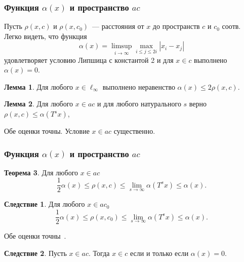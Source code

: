 \documentclass[10pt,pdf,hyperref={unicode},aspectratio=169]{beamer}
\theoremstyle{definition}
\newtheorem{llemma}{Лемма}
\newtheorem{ttheorem}[llemma]{Теорема}
\newtheorem{ccorollary}{Следствие}[llemma]
\begin{document}
\begin{frame}
	\frametitle{Функция $\alpha(x)$ и пространство $ac$~\cite{our-mz2019ac0}}
	Пусть $\rho(x,c)$ и $\rho(x,c_0)$~--- расстояния от $x$ до пространств $c$
	и $c_0$ соотв.
	Легко видеть, что функция
	\begin{equation*}
		\alpha(x) = \limsup_{i\to\infty} \max_{i \leq j \leq 2i} |x_i-x_j|
	\end{equation*}
	удовлетворяет условию Липшица с константой 2
	и для $x\in c$ выполнено
	$\alpha(x)=0$.

	\begin{llemma}
	\label{thm:alpha_x_leq_2_rho_x_c}
		Для любого $x\in\ell_\infty$
		выполнено неравенство
		$
			\alpha(x) \leq 2\rho(x, c)
		$.
	\end{llemma}


	\begin{llemma}
	\label{thm:rho_x_c_leq_alpha_t_s_x}
		Для любого $x\in ac$ и для любого натурального $s$ верно
		$
			\rho(x,c)\leq \alpha(T^s x)
		$,
	\end{llemma}

	Обе оценки точны.
	Условие $x\in ac$ существенно.

\end{frame}


\begin{frame}
	\frametitle{Функция $\alpha(x)$ и пространство $ac$~\cite{our-mz2019ac0}}
	\begin{ttheorem}
		Для любого $x\in ac$
		\begin{equation*}
			\frac{1}{2} \alpha(x) \leq \rho(x,c)\leq \lim_{s\to\infty} \alpha(T^s x) \leq \alpha(x)
			.
		\end{equation*}
	\end{ttheorem}

	\begin{ccorollary}
		Для любого $x\in ac_0$
		\begin{equation*}
			\frac{1}{2} \alpha(x) \leq \rho(x,c_0)\leq \lim_{s\to\infty} \alpha(T^s x) \leq \alpha(x)
			.
		\end{equation*}
	\end{ccorollary}

	Обе оценки точны~\cite{our-ped-2018-alpha-Tx}.

	\begin{ccorollary}
		Пусть $x\in ac$.
		Тогда $x\in c$ если и только если $\alpha(x) = 0$.
	\end{ccorollary}

\end{frame}
\end{document}
